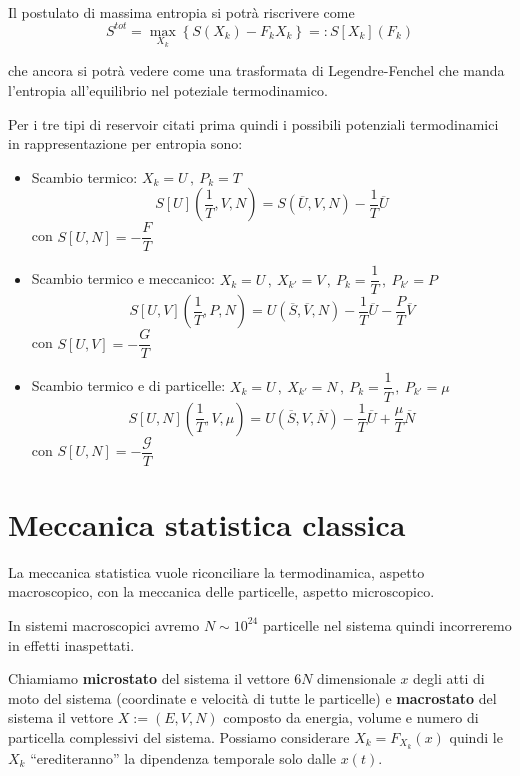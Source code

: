 \documentclass[11pt,a4paper,twoside]{book}
\newenvironment{importante}[1][~]{ 
  \begin{center}\begin{tcolorbox}[enhanced,
  before skip=2mm,after skip=3mm,
  boxrule=0.4pt,left=5mm,right=2mm,top=1mm,bottom=1mm,
  colback=white,
  colframe=white!20!black,
  sharp corners,arc=3mm,
  underlay={
  	\path[fill=red!50!black,draw=none] (interior.south west) rectangle 			
  	node[white]{\Huge\bfseries !} ([xshift=4mm]interior.north west);
  },
  drop fuzzy shadow]
 {\ifx\empty#1\relax\else\mdseries\bfseries#1\\\fi}
 \normalsize 
  }{
	\end{tcolorbox}\end{center}
}
\numberwithin{equation}{section} %
\begin{document}
\begin{importante}
Il postulato di massima entropia si potrà riscrivere come
\begin{equation}
S^{tot}=\max_{X_k}\left\{ S(X_k) - F_k X_k \right\} =: S[X_k](F_k)
\end{equation}
\end{importante}

che ancora si potrà vedere come una trasformata di Legendre-Fenchel che manda l'entropia all'equilibrio nel poteziale termodinamico.

Per i tre tipi di reservoir citati prima quindi i possibili potenziali termodinamici in rappresentazione per entropia sono:
\begin{itemize}[label=$\cdot$]
\item Scambio termico: $X_k=U\, , \> P_k=T$
\[
S[U]\left(\dfrac{1}{T},V,N\right) = S(\overline{U},V,N)-\dfrac{1}{T}\overline{U}
\]
con $S[U,N]=-\dfrac{F}{T}$
\item Scambio termico e meccanico: $X_k=U\, ,\> X_{k'}=V\, , \> P_k=\dfrac{1}{T}\, , \> P_{k'}=P$
\[
S[U,V]\left(\dfrac{1}{T},P,N\right) = U(\overline{S},\overline{V},N)-\dfrac{1}{T}\overline{U}-\dfrac{P}{T}\overline{V}
\]
con $S[U,V]=-\dfrac{G}{T}$
\item Scambio termico e di particelle: $X_k=U\, ,\> X_{k'}=N\, , \> P_k=\dfrac{1}{T}\, , \> P_{k'}=\mu$
\[
S[U,N]\left(\dfrac{1}{T},V,\mu\right) = U(\overline{S},V,\overline{N})-\dfrac{1}{T}\overline{U} +\dfrac{\mu}{T}\overline{N}
\]
con $S[U,N]=-\dfrac{\mathcal{G}}{T}$
\end{itemize}


\section{Meccanica statistica classica}
La meccanica statistica vuole riconciliare la termodinamica, aspetto macroscopico, con la meccanica delle particelle, aspetto microscopico.

In sistemi macroscopici avremo $N\sim 10^{24}$ particelle nel sistema quindi incorreremo in effetti inaspettati.

Chiamiamo \textbf{microstato} del sistema il vettore $6N$ dimensionale $x$ degli atti di moto del sistema (coordinate e velocità di tutte le particelle) e  \textbf{macrostato} del sistema il vettore $X:=(E,V,N)$ composto da energia, volume e numero di particella complessivi del sistema.
Possiamo considerare $X_k=F_{X_k}(x)$ quindi le $X_k$ ``erediteranno'' la dipendenza temporale solo dalle $x(t)$.
\end{document}

